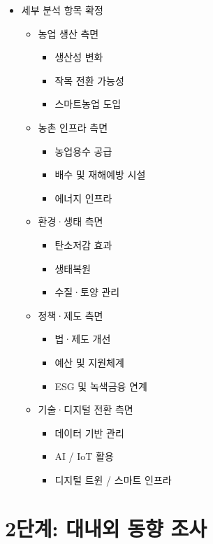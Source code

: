\documentclass[11pt,a4paper]{article}
\begin{document}
\begin{itemize}
    \item 세부 분석 항목 확정
    \begin{itemize}
        \item 농업 생산 측면
        \begin{itemize}
            \item 생산성 변화
            \item 작목 전환 가능성
            \item 스마트농업 도입
        \end{itemize}
        \item 농촌 인프라 측면
        \begin{itemize}
            \item 농업용수 공급
            \item 배수 및 재해예방 시설
            \item 에너지 인프라
        \end{itemize}
        \item 환경·생태 측면
        \begin{itemize}
            \item 탄소저감 효과
            \item 생태복원
            \item 수질·토양 관리
        \end{itemize}
        \item 정책·제도 측면
        \begin{itemize}
            \item 법·제도 개선
            \item 예산 및 지원체계
            \item ESG 및 녹색금융 연계
        \end{itemize}
        \item 기술·디지털 전환 측면
        \begin{itemize}
            \item 데이터 기반 관리
            \item AI / IoT 활용
            \item 디지털 트윈 / 스마트 인프라
        \end{itemize}
    \end{itemize}
\end{itemize}

\section*{2단계: 대내외 동향 조사}
\end{document}
